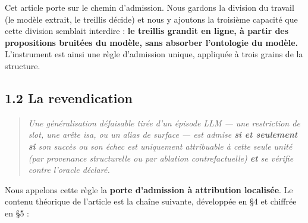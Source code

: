 \documentclass[11pt]{article}
\begin{document}
Cet article porte sur le chemin d'admission. Nous gardons la division du travail (le modèle extrait, le treillis décide) et nous y ajoutons la troisième capacité que cette division semblait interdire : \textbf{le treillis grandit en ligne, à partir des propositions bruitées du modèle, sans absorber l'ontologie du modèle.} L'instrument est ainsi une règle d'admission unique, appliquée à trois grains de la structure.

\subsection*{1.2 La revendication}

\begin{quote}\itshape Une généralisation défaisable tirée d'un épisode LLM — une restriction de slot, une arête \emph{isa}, ou un alias de surface — est admise \textbf{si et seulement si} son succès ou son échec est \emph{uniquement attribuable} à cette seule unité (par provenance structurelle ou par ablation contrefactuelle) \textbf{et} se vérifie contre l'oracle déclaré.\end{quote}

Nous appelons cette règle la \textbf{porte d'admission à attribution localisée}. Le contenu théorique de l'article est la chaîne suivante, développée en §4 et chiffrée en §5 :
\end{document}

